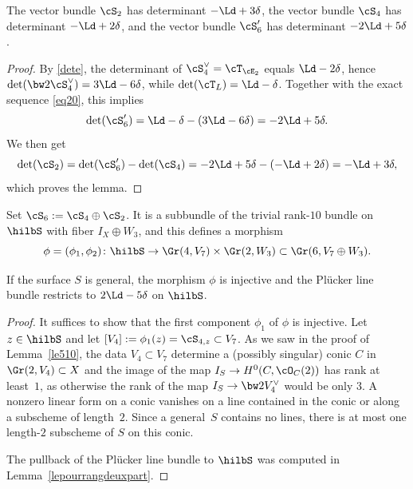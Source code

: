 \begin{lemm} \label{lepourrangdeuxpart}
The vector bundle
$\cS_2$ has determinant $-\Ld+3\delta$, the vector bundle
$\cS_4$ has determinant $- \Ld+2\delta$, and the vector bundle
$\cS_6'$ has determinant $-2\Ld+5\delta$.
\end{lemm}

\begin{proof} By \eqref{dete}, the determinant of $\cS_4^\vee=\cT_{\cE_2}$ equals $\Ld-2\delta$, hence $\det (\bw2\cS_4^\vee)=3\Ld-6\delta$, while $\det (\cT_{L})=\Ld-\delta$. Together with the exact sequence \eqref{eq20}, this implies
\begin{equation}\label{dets6}
\det (\cS_6')=\Ld-\delta-(3\Ld-6\delta)=-2\Ld+5\delta.
\end{equation}
We then get
\[
\det (\cS_2)=\det(\cS'_6)-\det(\cS_4)=-2\Ld+5\delta -(-\Ld+2\delta)=-\Ld+3\delta,
\]
which proves the lemma.
\end{proof}

Set $\cS_6:=\cS_4\oplus \cS_2$. It is a subbundle of the trivial rank-$10$ bundle on $\hilbS$ with fiber $I_X\oplus W_3$, and this defines a morphism
\begin{equation}\label{defphi}
\phi=(\phi_1,\phi_2)\colon \hilbS\to \Gr(4,V_7)\times \Gr(2,W_3)\subset \Gr(6,V_7\oplus W_3).
\end{equation}

\begin{lemm} \label{lem513}
If the surface $S$ is general, {the morphism $\phi$ is injective} and the Plücker line bundle restricts to $2\Ld-5\delta$ on $\hilbS$.
\end{lemm}

\begin{proof} It suffices to show that the first component $\phi_1$ of $\phi$ is injective.
Let $z\in\hilbS$ and let $ [V_4]:=\phi_1(z)=\cS_{4,z} \subset V_7$.
As we saw in the proof of Lemma~\ref{le510}, the data $V_4\subset V_7$ determine a (possibly singular) conic $C$ in $ \Gr(2,V_4)\subset X$ and
the image of the map $I_S\to H^0(C,\cO_C(2))$ has rank at least~$1$, as otherwise the rank
of the map $I_S\to \bw2V_4^\vee$ would be only $3$. A nonzero linear form
on a conic vanishes on a line contained in the conic or along a subscheme of length~$2$. Since a general~$S$ contains no lines, there is at most one length-$2$ subscheme
of $S$ on this conic.

The pullback of the Plücker line bundle to $\hilbS$ was computed in Lemma~\ref{lepourrangdeuxpart}.
\end{proof}

